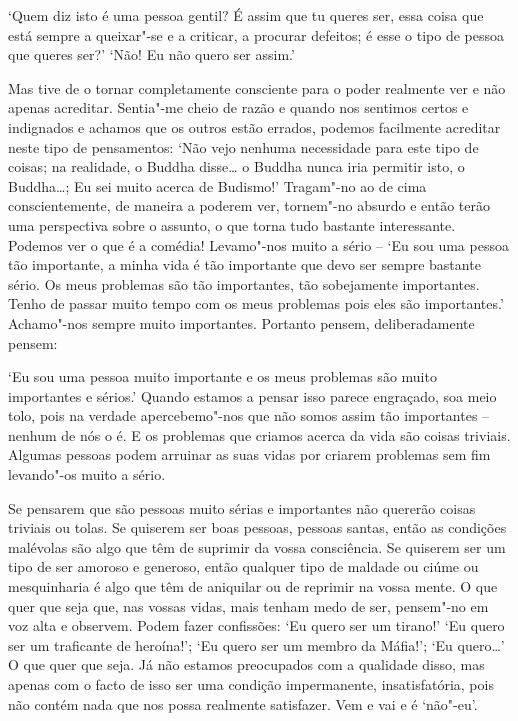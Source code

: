 `Quem diz isto é uma pessoa gentil? É assim que tu queres ser, essa
coisa que está sempre a queixar"-se e a criticar, a procurar defeitos; é
esse o tipo de pessoa que queres ser?' `Não! Eu não quero ser assim.'

Mas tive de o tornar completamente consciente para o poder realmente ver
e não apenas acreditar. Sentia"-me cheio de razão e quando nos sentimos
certos e indignados e achamos que os outros estão errados, podemos
facilmente acreditar neste tipo de pensamentos: `Não vejo nenhuma
necessidade para este tipo de coisas; na realidade, o Buddha disse\ldots{}
o Buddha nunca iria permitir isto, o Buddha\ldots{}; Eu sei
muito acerca de Budismo!' Tragam"-no ao de cima conscientemente, de
maneira a poderem ver, tornem"-no absurdo e então terão uma perspectiva
sobre o assunto, o que torna tudo bastante interessante. Podemos ver o
que é a comédia! Levamo"-nos muito a sério -- `Eu sou uma pessoa tão
importante, a minha vida é tão importante que devo ser sempre bastante
sério. Os meus problemas são tão importantes, tão sobejamente
importantes. Tenho de passar muito tempo com os meus problemas pois eles
são importantes.' Achamo"-nos sempre muito importantes. Portanto pensem,
deliberadamente pensem:

`Eu sou uma pessoa muito importante e os meus problemas são muito
importantes e sérios.' Quando estamos a pensar isso parece engraçado,
soa meio tolo, pois na verdade apercebemo"-nos que não somos assim tão
importantes -- nenhum de nós o é. E os problemas que criamos acerca da
vida são coisas triviais. Algumas pessoas podem arruinar as suas vidas
por criarem problemas sem fim levando"-os muito a sério.

Se pensarem que são pessoas muito sérias e importantes não quererão
coisas triviais ou tolas. Se quiserem ser boas pessoas, pessoas santas,
então as condições malévolas são algo que têm de suprimir da vossa
consciência. Se quiserem ser um tipo de ser amoroso e generoso, então
qualquer tipo de maldade ou ciúme ou mesquinharia é algo que têm de
aniquilar ou de reprimir na vossa mente. O que quer que seja que, nas
vossas vidas, mais tenham medo de ser, pensem"-no em voz alta e observem.
Podem fazer confissões: `Eu quero ser um tirano!' `Eu quero ser um
traficante de heroína!'; `Eu quero ser um membro da Máfia!'; `Eu quero\ldots{}'
O que quer que seja. Já não estamos preocupados com a
qualidade disso, mas apenas com o facto de isso ser uma condição
impermanente, insatisfatória, pois não contém nada que nos possa
realmente satisfazer. Vem e vai e é `não"-eu'.

